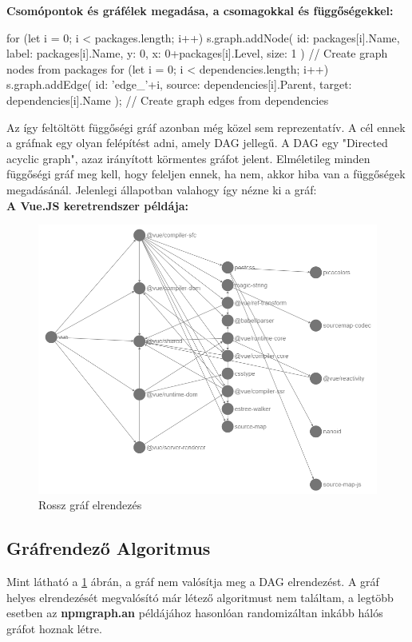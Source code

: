 \pagebreak

\textbf{Csomópontok és gráfélek megadása, a csomagokkal és függőségekkel:}

\begin{cpp}
for (let i = 0; i < packages.length; i++) { 
	s.graph.addNode({
		id: packages[i].Name,
		label: packages[i].Name,
		y: 0,
		x: 0+packages[i].Level,
		size: 1
	})        
}// Create graph nodes from packages
for (let i = 0; i < dependencies.length; i++) {
	s.graph.addEdge({
		id: 'edge_'+i,
		source: dependencies[i].Parent,
		target: dependencies[i].Name
	});
} // Create graph edges from dependencies
\end{cpp}

Az így feltöltött függőségi gráf azonban még közel sem reprezentatív. A cél ennek a gráfnak egy olyan felépítést adni, amely DAG jellegű. A DAG egy "Directed acyclic graph", azaz irányított körmentes gráfot jelent. Elméletileg minden függőségi gráf meg kell, hogy feleljen ennek, ha nem, akkor hiba van a függőségek megadásánál. Jelenlegi állapotban valahogy így nézne ki a gráf:\\

\textbf{A Vue.JS keretrendszer példája:}

\begin{figure}[!h]
	\centering
	\includegraphics[scale=0.4]{images/graph_wrong.png}
	\caption{Rossz gráf elrendezés}
	\label{fig:graph_wrong}
\end{figure}

\pagebreak

\subsection{Gráfrendező Algoritmus}
Mint látható a \ref{fig:graph_wrong} ábrán, a gráf nem valósítja meg a DAG elrendezést. A gráf helyes elrendezését megvalósító már létező algoritmust nem találtam, a legtöbb esetben az \textbf{npmgraph.an} példájához hasonlóan randomizáltan inkább hálós gráfot hoznak létre. \\

